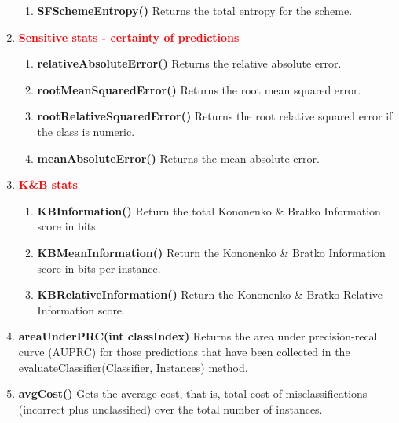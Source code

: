 \documentclass[a4paper,12pt, english]{article}
\begin{document}
\begin{enumerate}
\begin{enumerate}
\item \textbf{SFSchemeEntropy()}
          Returns the total entropy for the scheme. 

\end{enumerate}



\item \textbf{\textcolor{red}{Sensitive stats - certainty of predictions}}
\begin{enumerate}

\item \textbf{relativeAbsoluteError()}
          Returns the relative absolute error. 

\item \textbf{rootMeanSquaredError()}
          Returns the root mean squared error.           

\item \textbf{rootRelativeSquaredError()}
          Returns the root relative squared error if the class is numeric. 
                    
\item \textbf{meanAbsoluteError()}
          Returns the mean absolute error. 
\end{enumerate}    

\item  \textbf{\textcolor{red}{K\&B stats}}
\begin{enumerate}          
\item \textbf{KBInformation()}
          Return the total Kononenko \& Bratko Information score in bits. 
          
\item \textbf{KBMeanInformation()}
          Return the Kononenko \& Bratko Information score in bits per instance. 
          
\item \textbf{KBRelativeInformation()}
          Return the Kononenko \& Bratko Relative Information score.
\end{enumerate}


\item \textbf{areaUnderPRC(int classIndex)}
          Returns the area under precision-recall curve (AUPRC) for those predictions that have been collected in the evaluateClassifier(Classifier, Instances) method.
          


\item \textbf{avgCost()}
          Gets the average cost, that is, total cost of misclassifications (incorrect plus unclassified) over the total number of instances.


\end{enumerate}
\end{document}
